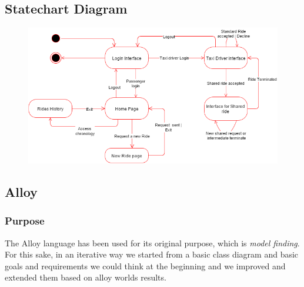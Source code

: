 \documentclass{article}
\begin{document}
\newpage

\subsection{Statechart Diagram}

    \begin{figure}[h!]
        \centering
        \includegraphics[width=1\columnwidth]{Statechart}
        \label{fig:statechart}
    \end{figure}

\newpage

\subsection{Alloy}
\subsubsection{Purpose}
The Alloy language has been used for its original purpose, which is \textit{model finding}. 
For this sake, in an iterative way we started from a basic class diagram and basic goals 
and requirements we could think at the beginning and we improved and extended them based on 
alloy worlds results.
\end{document}
